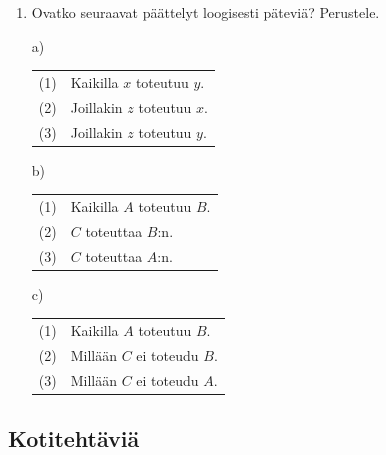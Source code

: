 \begin{enumerate}
\item
Ovatko seuraavat päättelyt loogisesti päteviä? Perustele.

a)  
\begin{tabular}{ll}
 (1) & Kaikilla $x$ toteutuu $y$.  \\
 (2) & Joillakin $z$ toteutuu $x$. \\ \hline
 (3) &  Joillakin $z$ toteutuu $y$.
\end{tabular}

b)  
\begin{tabular}{ll}
(1) & Kaikilla $A$ toteutuu $B$.\\
(2) & $C$ toteuttaa $B$:n. \\ \hline
(3) & $C$ toteuttaa $A$:n.
\end{tabular}

c)  
\begin{tabular}{ll}
(1) & Kaikilla $A$ toteutuu $B$.\\
(2) & Millään $C$ ei toteudu $B$.\\ \hline
(3) & Millään $C$ ei toteudu $A$.
\end{tabular}

\end{enumerate}

\subsection*{Kotitehtäviä}

